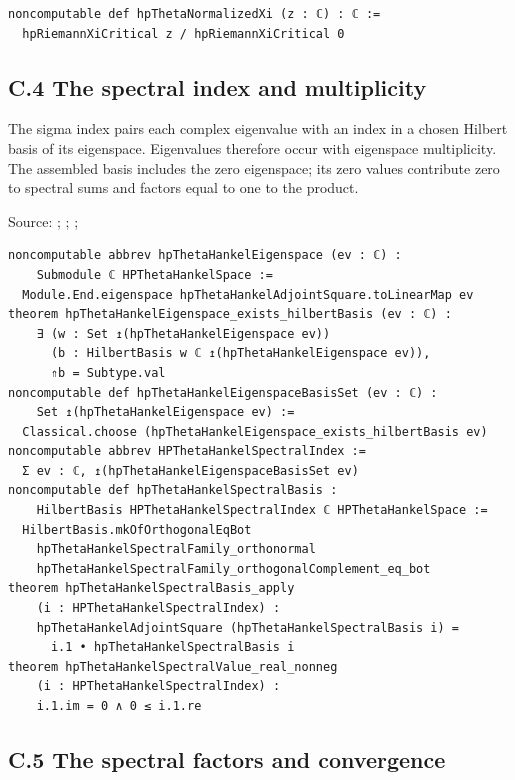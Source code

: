 \documentclass[
  11pt,
]{article}
\begin{document}
\begin{verbatim}
noncomputable def hpThetaNormalizedXi (z : ℂ) : ℂ :=
  hpRiemannXiCritical z / hpRiemannXiCritical 0
\end{verbatim}

\hypertarget{c.4-the-spectral-index-and-multiplicity}{%
\subsection{C.4 The spectral index and multiplicity}\label{c.4-the-spectral-index-and-multiplicity}}

The sigma index pairs each complex eigenvalue with an index in a chosen Hilbert basis of its eigenspace. Eigenvalues therefore occur with eigenspace multiplicity. The assembled basis includes the zero eigenspace; its zero values contribute zero to spectral sums and factors equal to one to the product.

Source: ; ; ; 

\begin{verbatim}
noncomputable abbrev hpThetaHankelEigenspace (ev : ℂ) :
    Submodule ℂ HPThetaHankelSpace :=
  Module.End.eigenspace hpThetaHankelAdjointSquare.toLinearMap ev
theorem hpThetaHankelEigenspace_exists_hilbertBasis (ev : ℂ) :
    ∃ (w : Set ↥(hpThetaHankelEigenspace ev))
      (b : HilbertBasis w ℂ ↥(hpThetaHankelEigenspace ev)),
      ⇑b = Subtype.val
noncomputable def hpThetaHankelEigenspaceBasisSet (ev : ℂ) :
    Set ↥(hpThetaHankelEigenspace ev) :=
  Classical.choose (hpThetaHankelEigenspace_exists_hilbertBasis ev)
noncomputable abbrev HPThetaHankelSpectralIndex :=
  Σ ev : ℂ, ↥(hpThetaHankelEigenspaceBasisSet ev)
noncomputable def hpThetaHankelSpectralBasis :
    HilbertBasis HPThetaHankelSpectralIndex ℂ HPThetaHankelSpace :=
  HilbertBasis.mkOfOrthogonalEqBot
    hpThetaHankelSpectralFamily_orthonormal
    hpThetaHankelSpectralFamily_orthogonalComplement_eq_bot
theorem hpThetaHankelSpectralBasis_apply
    (i : HPThetaHankelSpectralIndex) :
    hpThetaHankelAdjointSquare (hpThetaHankelSpectralBasis i) =
      i.1 • hpThetaHankelSpectralBasis i
theorem hpThetaHankelSpectralValue_real_nonneg
    (i : HPThetaHankelSpectralIndex) :
    i.1.im = 0 ∧ 0 ≤ i.1.re
\end{verbatim}

\hypertarget{c.5-the-spectral-factors-and-convergence}{%
\subsection{C.5 The spectral factors and convergence}\label{c.5-the-spectral-factors-and-convergence}}
\end{document}

